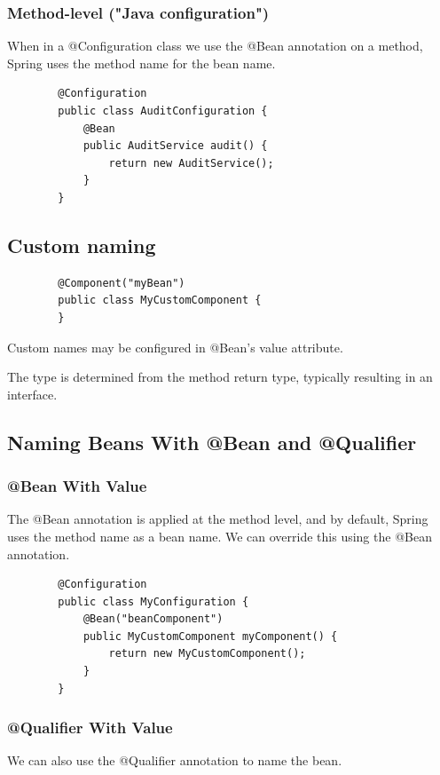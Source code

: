\documentclass{scrartcl}
\begin{document}
\subsubsection{Method-level ("Java configuration")}
When in a @Configuration class we use the @Bean annotation on a method, Spring uses the method name for the bean name.

    \begin{lstlisting}
        @Configuration
        public class AuditConfiguration {
            @Bean
            public AuditService audit() {
                return new AuditService();
            }
        }
    \end{lstlisting}

\subsection{Custom naming}

    \begin{lstlisting}
        @Component("myBean")
        public class MyCustomComponent {
        }
    \end{lstlisting}

   Custom names may be configured in @Bean's value attribute.

   The type is determined from the method return type, typically resulting in an interface.

\subsection{Naming Beans With @Bean and @Qualifier}
\subsubsection{@Bean With Value}
    The @Bean annotation is applied at the method level, and by default, Spring uses the method name as a bean name. We can override this using the @Bean annotation.

     \begin{lstlisting}
        @Configuration
        public class MyConfiguration {
            @Bean("beanComponent")
            public MyCustomComponent myComponent() {
                return new MyCustomComponent();
            }
        }
    \end{lstlisting}

\subsubsection{@Qualifier With Value}
    We can also use the @Qualifier annotation to name the bean.
\end{document}
